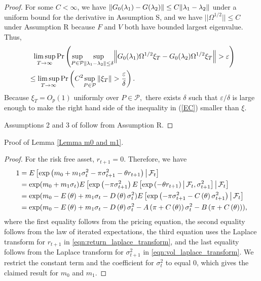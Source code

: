 \documentclass[11pt, letterpaper, twoside]{article}
\begin{document}
\begin{appendices}
\begin{proof}
%
For some $C < \infty$, we have $\lVert G_{0}(\lambda _{1})-G(\lambda _{2})\rVert \leq C \lVert\lambda _{1}-\lambda _{2}\rVert$ under a uniform bound for the derivative in Assumption S, and we have $||\Omega ^{1/2}||\leq C$ under Assumption R
because $F$ and $V$ both have bounded largest eigenvalue. 
Thus,
%
\begin{align}
    &\phantom{=} \underset{T\rightarrow \infty }{\lim \sup }\Pr\left( \underset{P\in \mathcal{P}}{\sup }\underset{\norm{\lambda _{1}-\lambda _{2}}\leq \delta }{\sup }\norm*{ G_{0}(\lambda _{1})\Omega ^{1/2}\xi _{T}-G_{0}(\lambda _{2})\Omega ^{1/2}\xi _{T}} > \varepsilon \right)  \nonumber \\
%
    &\leq \underset{T\rightarrow \infty }{\lim \sup }\Pr \left( C^{2}\underset{ P\in \mathcal{P}}{\sup }\left \Vert \xi _{T}\right \Vert >\frac{\varepsilon }{\delta }\right). 
%
    \label{EC}
\end{align}
%
Because $\xi _{T}=O_{p}(1)$ uniformly over $P\in \mathcal{P},$ there exists $%
\delta $ such that $\varepsilon /\delta $ is large enough to make the right
hand side of the inequality in (\ref{EC}) smaller than $\xi .$

Assumptions 2 and 3 of \textcite[Theorem 1]{andrews2016conditional} follow from Assumption R. 
\end{proof}

Proof of Lemma \ref{Lemma m0 and m1}. 

\begin{proof}
For the risk free asset, $ r_{t+1}=0.$ 
Therefore, we have
%
\begin{align*}
    1 &= E\left[ \exp \left( m_{0}+m_{1}\sigma _{t}^{2}-\pi \sigma _{t+1}^{2}-\theta r_{t+1}\right) \mvert \F_{t}\right]  \\
%
    &= \exp (m_{0}+m_{1}\sigma _{t})E\left[ \exp \left( -\pi \sigma _{t+1}^{2}\right) E\left[ \exp \left( -\theta r_{t+1}\right) \mvert \F _{t},\sigma _{t+1}^{2}\right] \mvert \F_{t}\right]  \\
%
    &= \exp (m_{0}-E\left( \theta \right) +m_{1}\sigma _{t}-D\left( \theta \right) \sigma _{t}^{2})E\left[ \exp \left( -\pi \sigma _{t+1}^{2}-C\left( \theta \right) \sigma _{t+1}^{2}\right) \mvert \F_{t}\right]  \\
%
    &= \exp (m_{0}-E\left( \theta \right) +m_{1}\sigma _{t}-D\left( \theta \right) \sigma _{t}^{2}-A\left( \pi +C\left( \theta \right) \right) \sigma _{t}^{2}-B\left( \pi +C\left( \theta \right) \right) ),
%
\end{align*}
%
where the first equality follows from the pricing equation, the second equality follows from the law of iterated expectations, the third equation uses the Laplace transform for $r_{t+1}$ in \cref{eqn:return_laplace_transform}, and the last equality follows from the Laplace transform for $\sigma _{t+1}^{2}$ in \cref{eqn:vol_laplace_transform}. 
We restrict the constant term and the coefficient for $\sigma_{t}^{2}$ to equal 0, which gives the claimed result for $m_{0}$ and $m_{1}.$


\end{proof}
\end{appendices}
\end{document}
